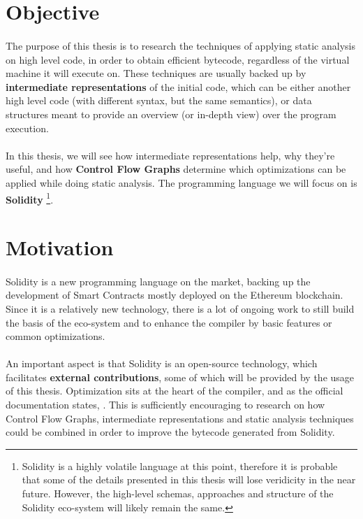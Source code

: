 \section{Objective}

\paragraph*{}
The purpose of this thesis is to research the techniques of applying static analysis on high level code, in order to obtain efficient bytecode, regardless of the virtual machine it will execute on. These techniques are usually backed up by \textbf{intermediate representations} of the initial code, which can be either another high level code (with different syntax, but the same semantics), or data structures meant to provide an overview (or in-depth view) over the program execution.

\paragraph*{}
In this thesis, we will see how intermediate representations help, why they're useful, and how \textbf{Control Flow Graphs} determine which optimizations can be applied while doing static analysis. The programming language we will focus on is \textbf{Solidity} \footnote{Solidity is a highly volatile language at this point, therefore it is probable that some of the details presented in this thesis will lose veridicity in the near future. However, the high-level schemas, approaches and structure of the Solidity eco-system will likely remain the same.}.

\section{Motivation}

\paragraph*{}
Solidity is a new programming language on the market, backing up the development of Smart Contracts mostly deployed on the Ethereum blockchain. Since it is a relatively new technology, there is a lot of ongoing work to still build the basis of the eco-system and to enhance the compiler by basic features or common optimizations.

\paragraph*{}
An important aspect is that Solidity is an open-source technology, which facilitates \textbf{external contributions}, some of which will be provided by the usage of this thesis. Optimization sits at the heart of the compiler, and as the official documentation states, \cite[the optimizer is under heavy development]{solidity-yul-optimizer}. This is sufficiently encouraging to research on how Control Flow Graphs, intermediate representations and static analysis techniques could be combined in order to improve the bytecode generated from Solidity.

